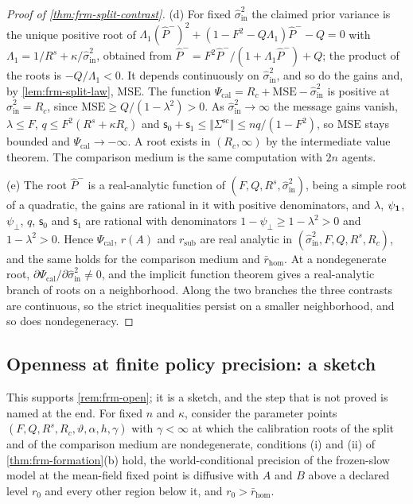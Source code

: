 \begin{proof}[Proof of \cref{thm:frm-split-contrast}]
(d) For fixed $\hat\sigma^2_{\mathrm{in}}$ the claimed prior variance is the unique positive root of $\Lambda_1(\hat P^-)^2+(1-F^2-Q\Lambda_1)\hat P^--Q=0$ with $\Lambda_1=1/R^s+\kappa/\hat\sigma^2_{\mathrm{in}}$, obtained from $\hat P^-=F^2\hat P^-/(1+\Lambda_1\hat P^-)+Q$; the product of the roots is $-Q/\Lambda_1<0$. It depends continuously on $\hat\sigma^2_{\mathrm{in}}$, and so do the gains and, by \cref{lem:frm-split-law}, $\mathrm{MSE}$. The function $\Psi_{\mathrm{cal}}=R_c+\mathrm{MSE}-\hat\sigma^2_{\mathrm{in}}$ is positive at $\hat\sigma^2_{\mathrm{in}}=R_c$, since $\mathrm{MSE}\ge Q/(1-\lambda^2)>0$. As $\hat\sigma^2_{\mathrm{in}}\to\infty$ the message gains vanish, $\lambda\le F$, $q\le F^2(R^s+\kappa R_c)$ and $\mathsf s_0+\mathsf s_1\le\Vert\Sigma^{\mathrm{sc}}\Vert\le nq/(1-F^2)$, so $\mathrm{MSE}$ stays bounded and $\Psi_{\mathrm{cal}}\to-\infty$. A root exists in $(R_c,\infty)$ by the intermediate value theorem. The comparison medium is the same computation with $2n$ agents.

(e) The root $\hat P^-$ is a real-analytic function of $(F,Q,R^s,\hat\sigma^2_{\mathrm{in}})$, being a simple root of a quadratic, the gains are rational in it with positive denominators, and $\lambda$, $\psi_{\mathbf{1}}$, $\psi_\perp$, $q$, $\mathsf s_0$ and $\mathsf s_1$ are rational with denominators $1-\psi_\perp\ge1-\lambda^2>0$ and $1-\lambda^2>0$. Hence $\Psi_{\mathrm{cal}}$, $r(A)$ and $r_{\mathrm{sub}}$ are real analytic in $(\hat\sigma^2_{\mathrm{in}},F,Q,R^s,R_c)$, and the same holds for the comparison medium and $\bar r_{\mathrm{hom}}$. At a nondegenerate root, $\partial\Psi_{\mathrm{cal}}/\partial\hat\sigma^2_{\mathrm{in}}\neq0$, and the implicit function theorem gives a real-analytic branch of roots on a neighborhood. Along the two branches the three contrasts are continuous, so the strict inequalities persist on a smaller neighborhood, and so does nondegeneracy.
\end{proof}

\subsection*{Openness at finite policy precision: a sketch}

This supports \cref{rem:frm-open}; it is a sketch, and the step that is not proved is named at the end. For fixed $n$ and $\kappa$, consider the parameter points $(F,Q,R^s,R_c,\vartheta,\alpha,h,\gamma)$ with $\gamma<\infty$ at which the calibration roots of the split and of the comparison medium are nondegenerate, conditions (i) and (ii) of \cref{thm:frm-formation}(b) hold, the world-conditional precision of the frozen-slow model at the mean-field fixed point is diffusive with $A$ and $B$ above a declared level $r_0$ and every other region below it, and $r_0>\bar r_{\mathrm{hom}}$.

